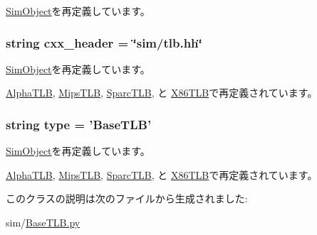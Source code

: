 \hyperlink{classm5_1_1SimObject_1_1SimObject_a17fa61ac3806b481cafee5593b55e5d0}{SimObject}を再定義しています。\hypertarget{classBaseTLB_1_1BaseTLB_a17da7064bc5c518791f0c891eff05fda}{
\subsubsection[{cxx\_\-header}]{\setlength{\rightskip}{0pt plus 5cm}string cxx\_\-header = \char`\"{}sim/tlb.hh\char`\"{}}}
\label{classBaseTLB_1_1BaseTLB_a17da7064bc5c518791f0c891eff05fda}


\hyperlink{classm5_1_1SimObject_1_1SimObject_a17da7064bc5c518791f0c891eff05fda}{SimObject}を再定義しています。

\hyperlink{classAlphaTLB_1_1AlphaTLB_a17da7064bc5c518791f0c891eff05fda}{AlphaTLB}, \hyperlink{classMipsTLB_1_1MipsTLB_a17da7064bc5c518791f0c891eff05fda}{MipsTLB}, \hyperlink{classSparcTLB_1_1SparcTLB_a17da7064bc5c518791f0c891eff05fda}{SparcTLB}, と \hyperlink{classX86TLB_1_1X86TLB_a17da7064bc5c518791f0c891eff05fda}{X86TLB}で再定義されています。\hypertarget{classBaseTLB_1_1BaseTLB_acce15679d830831b0bbe8ebc2a60b2ca}{
\subsubsection[{type}]{\setlength{\rightskip}{0pt plus 5cm}string type = '{\bf BaseTLB}'}}
\label{classBaseTLB_1_1BaseTLB_acce15679d830831b0bbe8ebc2a60b2ca}


\hyperlink{classm5_1_1SimObject_1_1SimObject_acce15679d830831b0bbe8ebc2a60b2ca}{SimObject}を再定義しています。

\hyperlink{classAlphaTLB_1_1AlphaTLB_acce15679d830831b0bbe8ebc2a60b2ca}{AlphaTLB}, \hyperlink{classMipsTLB_1_1MipsTLB_acce15679d830831b0bbe8ebc2a60b2ca}{MipsTLB}, \hyperlink{classSparcTLB_1_1SparcTLB_acce15679d830831b0bbe8ebc2a60b2ca}{SparcTLB}, と \hyperlink{classX86TLB_1_1X86TLB_acce15679d830831b0bbe8ebc2a60b2ca}{X86TLB}で再定義されています。

このクラスの説明は次のファイルから生成されました:\begin{DoxyCompactItemize}
\item 
sim/\hyperlink{BaseTLB_8py}{BaseTLB.py}\end{DoxyCompactItemize}

